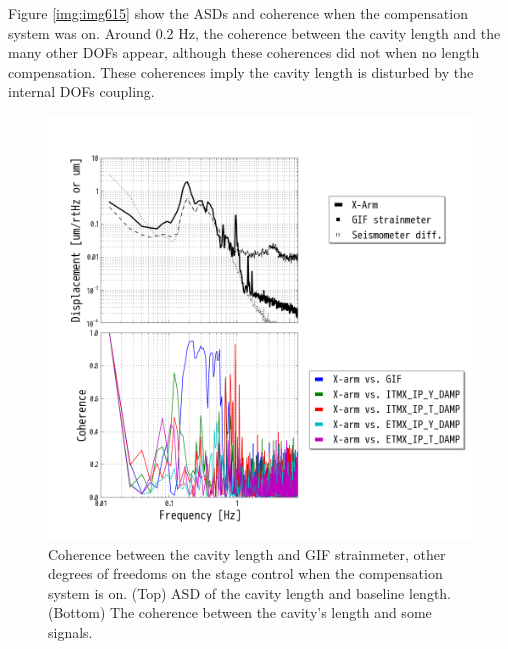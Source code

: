 Figure \ref{img:img615} show the ASDs and coherence when the compensation system was on. Around 0.2 Hz, the coherence between the cavity length and the many other DOFs appear, although these coherences did not when no length compensation. These coherences imply the cavity length is disturbed by the internal DOFs coupling.

\begin{figure}[p]
    \centering
    \includegraphics[width=15cm]{./img_chap6/img614.png}
    \caption{Coherence between the cavity length and GIF strainmeter, other degrees of freedoms on the stage control when the compensation system is on. (Top) ASD of the cavity length and baseline length. (Bottom) The coherence between the cavity's length and some signals.}\label{img:img614}
\end{figure}
